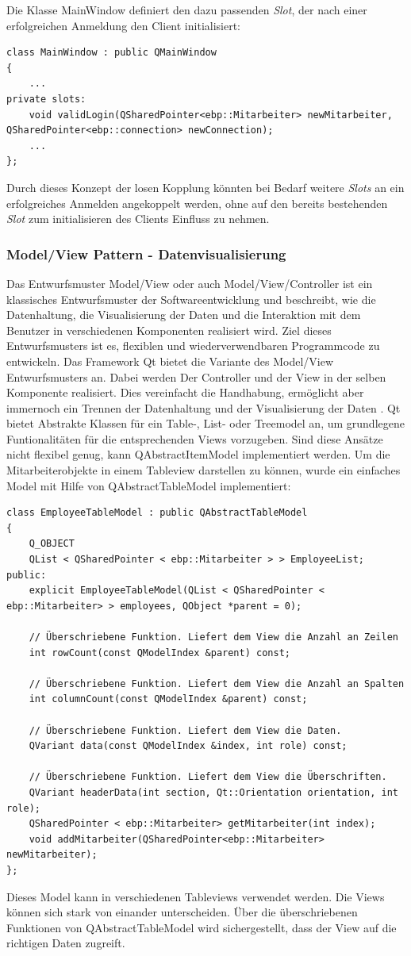 Die Klasse MainWindow definiert den dazu passenden \textit{Slot}, der nach einer erfolgreichen Anmeldung den Client initialisiert:
\begin{lstlisting}
class MainWindow : public QMainWindow
{
    ...
private slots:
    void validLogin(QSharedPointer<ebp::Mitarbeiter> newMitarbeiter, QSharedPointer<ebp::connection> newConnection);
    ...
};
\end{lstlisting}
Durch dieses Konzept der losen Kopplung könnten bei Bedarf weitere \textit{Slots} an ein erfolgreiches Anmelden angekoppelt werden, ohne auf den bereits bestehenden \textit{Slot} zum initialisieren des Clients Einfluss zu nehmen.
\subsubsection{Model/View Pattern - Datenvisualisierung}
Das Entwurfsmuster Model/View oder auch Model/View/Controller ist ein klassisches Entwurfsmuster der Softwareentwicklung und beschreibt, wie die Datenhaltung, die Visualisierung der Daten und die Interaktion mit dem Benutzer in verschiedenen Komponenten realisiert wird. Ziel dieses Entwurfsmusters ist es, flexiblen und wiederverwendbaren Programmcode zu entwickeln.
Das Framework Qt bietet die Variante des Model/View Entwurfsmusters an. Dabei werden Der Controller und der View in der selben Komponente realisiert. Dies vereinfacht die Handhabung, ermöglicht aber immernoch ein Trennen der Datenhaltung und der Visualisierung der Daten \cite[Vgl.]{QtModelView}.
Qt bietet Abstrakte Klassen für ein Table-, List- oder Treemodel an, um grundlegene Funtionalitäten für die entsprechenden Views vorzugeben. Sind diese Ansätze nicht flexibel genug, kann QAbstractItemModel implementiert werden. Um die Mitarbeiterobjekte in einem Tableview darstellen zu können, wurde ein einfaches Model mit Hilfe von QAbstractTableModel implementiert:
\begin{lstlisting}
class EmployeeTableModel : public QAbstractTableModel
{
    Q_OBJECT
    QList < QSharedPointer < ebp::Mitarbeiter > > EmployeeList;
public:
    explicit EmployeeTableModel(QList < QSharedPointer < ebp::Mitarbeiter> > employees, QObject *parent = 0);
    
    // Überschriebene Funktion. Liefert dem View die Anzahl an Zeilen    
    int rowCount(const QModelIndex &parent) const;

    // Überschriebene Funktion. Liefert dem View die Anzahl an Spalten
    int columnCount(const QModelIndex &parent) const;

    // Überschriebene Funktion. Liefert dem View die Daten.
    QVariant data(const QModelIndex &index, int role) const;

    // Überschriebene Funktion. Liefert dem View die Überschriften.
    QVariant headerData(int section, Qt::Orientation orientation, int role);
    QSharedPointer < ebp::Mitarbeiter> getMitarbeiter(int index);
    void addMitarbeiter(QSharedPointer<ebp::Mitarbeiter> newMitarbeiter);
};
\end{lstlisting}
Dieses Model kann in verschiedenen Tableviews verwendet werden. Die Views können sich stark von einander unterscheiden. Über die überschriebenen Funktionen von QAbstractTableModel wird sichergestellt, dass der View auf die richtigen Daten zugreift.
\newpage

